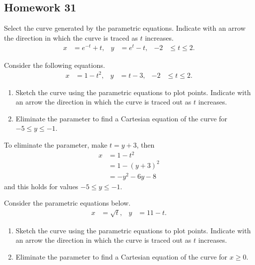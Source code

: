 \subsection{Homework 31}
\begin{problem}[WebAssign HW 31, \# 1]
Select the curve generated by the parametric equations. Indicate with an
arrow the direction in which the curve is traced as $t$ increases.
\[
  \begin{aligned}
    x&=e^{-t}+t,&y&=e^t-t,&-2&\leq t\leq 2.
  \end{aligned}
\]
\end{problem}
\begin{problem}[WebAssign HW 31, \# 2]
Consider the following equations.
\[
  \begin{aligned}
    x&=1-t^2,&y&=t-3,&-2&\leq t\leq 2.
  \end{aligned}
\]
\begin{enumerate}[label=(\alph*)]
\item Sketch the curve using the parametric equations to plot
  points. Indicate with an arrow the direction in which the curve is traced
  out as $t$ increases.
\item Eliminate the parameter to find a Cartesian equation of the curve for
  $-5\leq y\leq -1$.
\end{enumerate}
\end{problem}
\begin{problem}[Solution]
To eliminate the parameter, make $t=y+3$, then
\[
\begin{aligned}
  x&=1-t^2\\
   &=1-(y+3)^2\\
   &=-y^2-6y-8
\end{aligned}
\]
and this holds for values $-5\leq y\leq -1$.
\end{problem}
\begin{problem}[WebAssign HW 31, \# 3]
Consider the parametric equations below.
\[
  \begin{aligned}
    x&=\sqrt{t},&y&=11-t.
  \end{aligned}
\]
\begin{enumerate}[label=(\alph*)]
\item Sketch the curve using the parametric equations to plot
  points. Indicate with an arrow the direction in which the curve is traced
  out as $t$ increases.
\item Eliminate the parameter to find a Cartesian equation of the curve for
  $x\geq 0$.
\end{enumerate}
\end{problem}
